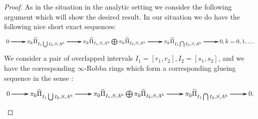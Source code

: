 \documentclass[12pt]{amsart}
\theoremstyle{definition}
\numberwithin{equation}{section}
\begin{document}
\begin{proof}
As in the situation in the analytic setting we consider the following argument which will show the desired result. In our situation we do have the following nice short exact sequences:
\[
\xymatrix@C+0pc@R+0pc{
0\ar[r] \ar[r] \ar[r] &\pi_k \widetilde{\Pi}_{I_1\bigcup I_2,S,A^h} \ar[r] \ar[r] \ar[r] &\pi_k\widetilde{\Pi}_{I_1,S,A^h}\bigoplus \pi_k\widetilde{\Pi}_{I_2,S,A^h} \ar[r] \ar[r] \ar[r] &\pi_k\widetilde{\Pi}_{I_1\bigcap I_2,S,A^h} \ar[r] \ar[r] \ar[r] &0, k=0,1,....
}
\]
We consider a pair of overlapped intervals $I_1=[r_1,r_2],I_2=[s_1,s_2]$, and we have the corresponding $\infty$-Robba rings which form a corresponding glueing sequence in the sense \cite[Definition 2.7.3]{KL1}:
\[
\xymatrix@C+0pc@R+0pc{
0\ar[r] \ar[r] \ar[r] &\pi_0\widetilde{\Pi}_{I_1\bigcup I_2,S,A^h} \ar[r] \ar[r] \ar[r] &\pi_0\widetilde{\Pi}_{I_1,S,A^h}\bigoplus \pi_0\widetilde{\Pi}_{I_2,S,A^h} \ar[r] \ar[r] \ar[r] &\pi_0\widetilde{\Pi}_{I_1\bigcap I_2,S,A^h} \ar[r] \ar[r] \ar[r] &0.
}
\] 	
	


\end{proof}
\end{document}

